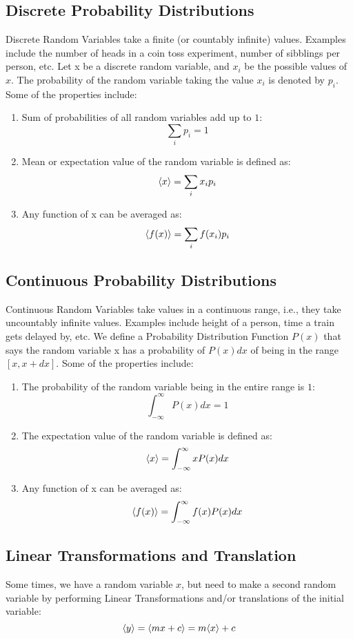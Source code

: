 \documentclass[12pt, oneside]{book}
\DeclarePairedDelimiter{\evdel}{\langle}{\rangle}
\newcommand{\ev}{\evdel}
\begin{document}
\subsection{Discrete Probability Distributions}
Discrete Random Variables take a finite (or countably infinite) values.
Examples include the number of heads in a coin toss experiment, number of sibblings per person, etc.
Let x be a discrete random variable, and \(x_i\) be the possible values of \(x\).
The probability of the random variable taking the value \(x_i\) is denoted by \(p_i\).
Some of the properties include:
\begin{enumerate}
    \item Sum of probabilities of all random variables add up to \(1\):
    \[\sum_{i} p_i = 1\]
    \item Mean or expectation value of the random variable is defined as:
    \[ \ev{x} = \sum_{i} x_i p_i \]
    \item Any function of x can be averaged as:
    \[ \ev{f(x)} = \sum_{i} f(x_i) p_i \]
\end{enumerate}

\subsection{Continuous Probability Distributions}
Continuous Random Variables take values in a continuous range, i.e., they take uncountably infinite values.
Examples include height of a person, time a train gets delayed by, etc.
We define a Probability Distribution Function \(P(x)\) that says the random variable x has a probability of \(P(x)dx\) of being in the range \([x, x+dx]\).
Some of the properties include:
\begin{enumerate}
    \item The probability of the random variable being in the entire range is \(1\):
    \[ \int_{-\infty}^{\infty} P(x)dx = 1 \]
    \item The expectation value of the random variable is defined as:
    \[ \ev{x} = \int_{-\infty}^{\infty} xP(x)dx \]
    \item Any function of x can be averaged as:
    \[ \ev{f(x)} = \int_{-\infty}^{\infty} f(x)P(x)dx \]
\end{enumerate}

\subsection{Linear Transformations and Translation}
Some times, we have a random variable \(x\), but need to make a second random variable by performing Linear Transformations and/or translations of the initial variable:
\[ \ev{y} = \ev{mx+c} = m\ev{x} + c \]
\end{document}
